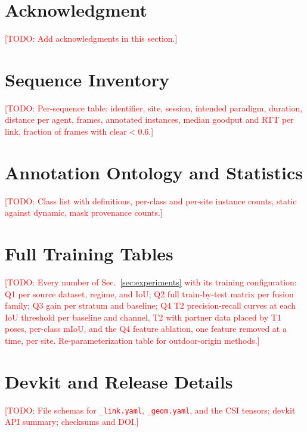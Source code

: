 \documentclass[journal]{IEEEtran}
\newcommand{\todo}[1]{\textcolor{red}{[TODO: #1]}}
\begin{document}
\section*{Acknowledgment}
\todo{Add acknowledgments in this section.}




\appendices
\section{Sequence Inventory}
\label{app:sequences}
\todo{Per-sequence table: identifier, site, session, intended
paradigm, duration, distance per agent, frames, annotated instances,
median goodput and RTT per link, fraction of frames with
$\mathrm{clear} < 0.6$.}

%

\section{Annotation Ontology and Statistics}
\label{app:ontology}
\todo{Class list with definitions, per-class and per-site instance
counts, static against dynamic, mask provenance counts.}

\section{Full Training Tables}
\label{app:results}
\todo{Every number of Sec.~\ref{sec:experiments} with its training
configuration: Q1 per source dataset, regime, and IoU; Q2 full
train-by-test matrix per fusion family; Q3 gain per stratum and
baseline; Q4 T2 precision-recall curves at each IoU threshold per
baseline and channel, T2 with partner data placed by T1 poses,
per-class mIoU, and the Q4 feature ablation, one feature removed at a
time, per site. Re-parameterization table for outdoor-origin methods.}

\section{Devkit and Release Details}
\label{app:devkit}
\todo{File schemas for \texttt{\_link.yaml}, \texttt{\_geom.yaml},
and the CSI tensors; devkit API summary; checksums and DOI.}

%

%
\end{document}
